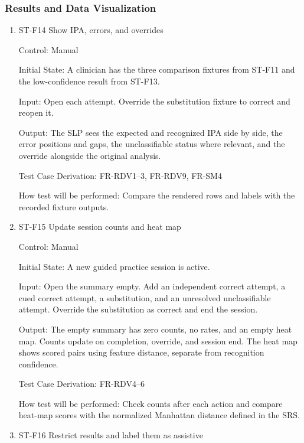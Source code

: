 \documentclass[12pt, titlepage]{article}
\begin{document}
\subsubsection{Results and Data Visualization}

\begin{enumerate}

\item{ST-F14 Show IPA, errors, and overrides\\}

Control: Manual

Initial State: A clinician has the three comparison fixtures from ST-F11 and the low-confidence result from ST-F13.

Input: Open each attempt. Override the substitution fixture to correct and reopen it.

Output: The SLP sees the expected and recognized IPA side by side, the error positions and gaps, the unclassifiable status where relevant, and the override alongside the original analysis.

Test Case Derivation: FR-RDV1--3, FR-RDV9, FR-SM4

How test will be performed: Compare the rendered rows and labels with the recorded fixture outputs.

\item{ST-F15 Update session counts and heat map\\}

Control: Manual

Initial State: A new guided practice session is active.

Input: Open the summary empty. Add an independent correct attempt, a cued correct attempt, a substitution, and an unresolved unclassifiable attempt. Override the substitution as correct and end the session.

Output: The empty summary has zero counts, no rates, and an empty heat map. Counts update on completion, override, and session end. The heat map shows scored pairs using feature distance, separate from recognition confidence.

Test Case Derivation: FR-RDV4--6

How test will be performed: Check counts after each action and compare heat-map scores with the normalized Manhattan distance defined in the SRS.

\item{ST-F16 Restrict results and label them as assistive\\}


\end{enumerate}
\end{document}
